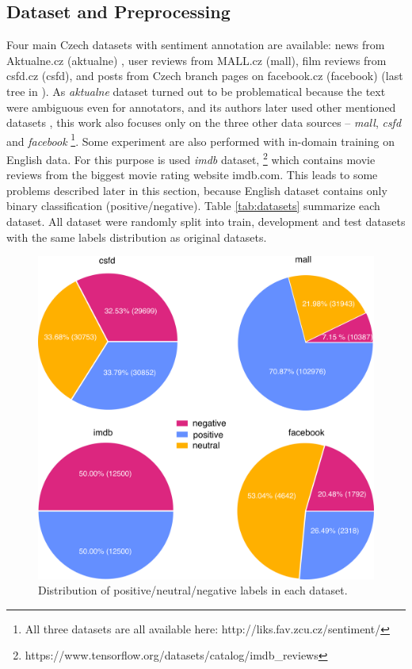\subsection{Dataset and Preprocessing}
Four main Czech datasets with sentiment annotation are available: news from Aktualne.cz (aktualne) \citep{Veselovska}, user reviews from MALL.cz (mall), film reviews from csfd.cz (csfd), and posts from Czech branch pages on facebook.cz (facebook) (last tree in \citep{Habernal.et.al.2013}). As \textit{aktualne} dataset turned out to be problematical because the text were ambiguous even for annotators, and its authors later used other mentioned datasets \citep{Veselovska}, this work also focuses only on the three other data sources -- \textit{mall}, \textit{csfd} and \textit{facebook} \footnote{All three datasets are all available here: http://liks.fav.zcu.cz/sentiment/}. Some experiment are also performed with in-domain training on English data. For this purpose is used \textit{imdb} dataset, \footnote{https://www.tensorflow.org/datasets/catalog/imdb\_reviews} which contains movie reviews from the biggest movie rating website imdb.com. This leads to some problems described later in this section, because English dataset contains only binary classification (positive/negative). Table \ref{tab:datasets} summarize each dataset. All dataset were randomly split into train, development and test datasets with the same labels distribution as original datasets.
\par
\begin{figure}[!h]
\centering
\includegraphics[width=0.95\columnwidth]{../img/dist_all.png}
\protect\caption{Distribution of positive/neutral/negative labels in each dataset.}
\label{pic:dist}
\end{figure}

